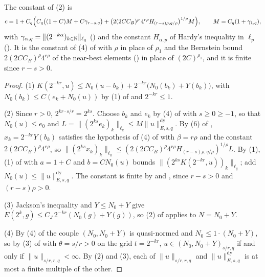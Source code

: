 The constant of (2) is
\[
  c = 1 + C_q \Bigl( C_q \bigl((1 + C) M + C \gamma_{r-s, q}\bigr)
    + \bigl(2 (2 C C_B)^\rho \, 4^{r\rho} H_{(r-s)\rho, q/\rho}\bigr)^{1/\rho} M \Bigr) ,
  \qquad M = C_q (1 + \gamma_{1, q}) ,
\]
with $\gamma_{\alpha, q} = \|(2^{-k\alpha})_{k \in \mathbb{N}}\|_{\ell_q}$ () and the
constant $H_{\alpha, p}$ of Hardy's inequality in $\ell_p$ (). It
is the constant of (4) of  with $\rho$ in place of $\rho_1$ and the
Bernstein bound $2 (2 C C_B)^\rho 4^{r\rho}$ of the near-best elements
() in place of $(2C)^{\rho_1}$, and it is finite since
$r - s > 0$.

\begin{proof}
\leanok
{}
(1) $K(2^{-kr}, u) \leq N_0(u - b_k) + 2^{-kr} \bigl(N_0(b_k) + Y(b_k)\bigr)$, with
$N_0(b_k) \leq C (e_k + N_0(u))$ by (1) of  and
$2^{-kr} \leq 1$.

(2) Since $r > 0$, $2^{kr \cdot s/r} = 2^{ks}$. Choose $b_k$ and $e_k$ by (4) of
 with $s \geq 0 \geq -1$, so that $N_0(u) \leq e_0$ and
$L = \|(2^{ks} e_k)_k\|_{\ell_q} \leq M \|u\|^{\mathrm{dy}}_{E, s, q}$. By (6) of
, $x_k = 2^{-kr} Y(b_k)$ satisfies the hypothesis of (4) of
 with $\beta = r\rho$ and the constant $2 (2 C C_B)^\rho 4^{r\rho}$, so
$\|(2^{ks} x_k)_k\|_{\ell_q} \leq (2 (2 C C_B)^\rho 4^{r\rho} H_{(r-s)\rho, q/\rho})^{1/\rho} L$.
By (1), (1) of  with $a = 1 + C$ and $b = C N_0(u)$ bounds
$\|(2^{ks} K(2^{-kr}, u))_k\|_{\ell_q}$; add $N_0(u) \leq \|u\|^{\mathrm{dy}}_{E, s, q}$. The
constant is finite by  and , since
$r - s > 0$ and $(r - s)\rho > 0$.

(3) Jackson's inequality and $Y \leq N_0 + Y$ give
$E(2^k, g) \leq C_J \, 2^{-kr} (N_0(g) + Y(g))$, so (2) of  applies
to $N = N_0 + Y$.

(4) By (4) of  the couple $(N_0, N_0 + Y)$ is quasi-normed
and $N_0 \leq 1 \cdot (N_0 + Y)$, so by (3) of  with
$\theta = s/r > 0$ on the grid $t = 2^{-kr}$, $u \in (N_0, N_0 + Y)_{s/r, q}$ if and only if
$\|u\|_{s/r, r, q} < \infty$. By (2) and (3), each of $\|u\|_{s/r, r, q}$ and
$\|u\|^{\mathrm{dy}}_{E, s, q}$ is at most a finite multiple of the other.
\end{proof}

